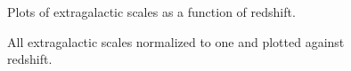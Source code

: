 \documentclass[12pt]{article}
\newcommand\tab[1][1cm]{\hspace*{#1}}
\begin{document}
\begin{figure}[ht!]
\centerline{}
\caption[]{Plots of extragalactic scales as a function of redshift.}
\label{xscale}
\end{figure}

\begin{figure}[ht!]
\tab \centerline{}
\caption[]{All extragalactic scales normalized to one and plotted against redshift.}
\label{xscale2}
\end{figure}
\end{document}
